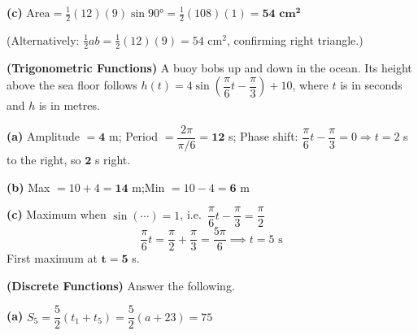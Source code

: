 \documentclass[addpoints]{exam}
\begin{document}
\begin{questions}
\begin{solution}[9cm]
\textbf{(c)} $\text{Area} = \tfrac{1}{2}(12)(9)\sin\ang{90} = \tfrac{1}{2}(108)(1)
= \mathbf{54 \text{ cm}^2}$

(Alternatively: $\tfrac{1}{2}ab = \tfrac{1}{2}(12)(9) = 54$ cm$^2$, confirming right triangle.)
\end{solution}

\question \textbf{(Trigonometric Functions)} A buoy bobs up and down in the ocean.
Its height above the sea floor follows $h(t) = 4\sin\!\left(\dfrac{\pi}{6}t - \dfrac{\pi}{3}\right) + 10$,
where $t$ is in seconds and $h$ is in metres.
\begin{solution}[9cm]
\textbf{(a)} Amplitude $= \mathbf{4}$ m;\quad
Period $= \dfrac{2\pi}{\pi/6} = \mathbf{12}$ s;\quad
Phase shift: $\dfrac{\pi}{6}t - \dfrac{\pi}{3} = 0 \Rightarrow t = 2$ s to the right, so $\mathbf{2}$ s right.

\textbf{(b)} Max $= 10 + 4 = \mathbf{14}$ m;\quad Min $= 10 - 4 = \mathbf{6}$ m

\textbf{(c)} Maximum when $\sin(\cdots) = 1$, i.e.\ $\dfrac{\pi}{6}t - \dfrac{\pi}{3} = \dfrac{\pi}{2}$
\[
\frac{\pi}{6}t = \frac{\pi}{2} + \frac{\pi}{3} = \frac{5\pi}{6}
\implies t = 5 \text{ s}
\]
First maximum at $\mathbf{t = 5}$ s.
\end{solution}

\question \textbf{(Discrete Functions)} Answer the following.
\begin{solution}[9cm]
\textbf{(a)} $S_5 = \dfrac{5}{2}(t_1 + t_5) = \dfrac{5}{2}(a + 23) = 75$


\end{solution}
\end{questions}
\end{document}
